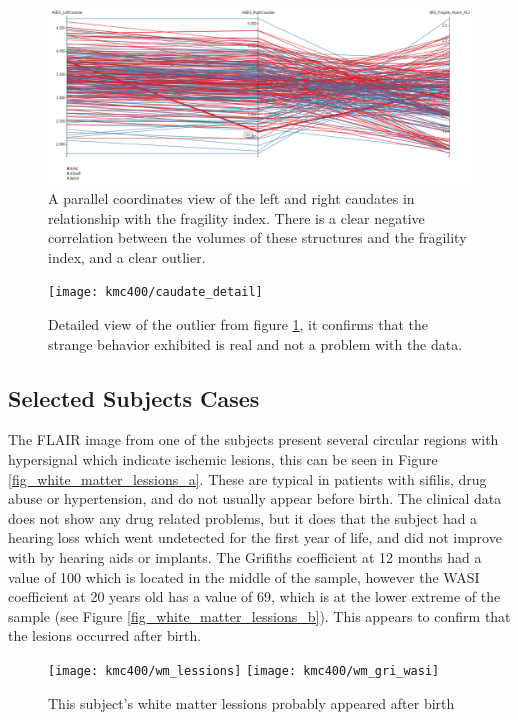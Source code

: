 \begin{figure}
	\centering
		\includegraphics[width=\textwidth]{figures/kmc400/caudate_parallel}
	\caption{A parallel coordinates view of the left and right caudates in relationship with the fragility index. There is a clear negative correlation between the volumes of these structures and the fragility index, and a clear outlier.}
	\label{fig_caudate_parallel}
\end{figure}


\begin{figure}
	\centering
		\texttt{[image: kmc400/caudate\_detail]}
	\caption{Detailed view of the outlier from figure \ref{fig_caudate_parallel}, it confirms that the strange behavior exhibited is real and not a problem with the data.}
	\label{fig_asymetric_caudate_detail}
\end{figure}

\subsection{Selected Subjects Cases}
 
The FLAIR image from one of the subjects present several circular regions with hypersignal which indicate ischemic lesions, this can be seen in Figure \ref{fig_white_matter_lessions_a}. These are typical in patients with sifilis, drug abuse or hypertension, and do not usually appear before birth. The clinical data does not show any drug related problems, but it does  that the subject had a hearing loss which went undetected for the first year of life, and did not improve with by hearing aids or implants. 
The Grifiths coefficient at 12 months had a value of 100 which is located in the middle of the sample, however the WASI coefficient at 20 years old has a value of 69, which is at the lower extreme of the sample (see Figure \ref{fig_white_matter_lessions_b}). This appears to confirm that the lesions occurred after birth.

\begin{figure}
	\centering
		{\texttt{[image: kmc400/wm\_lessions]}} \hfill
		{\texttt{[image: kmc400/wm\_gri\_wasi]}}
	\caption{This subject's white matter lessions probably appeared after birth}
	\label{fig_white_matter_lessions}
\end{figure}


